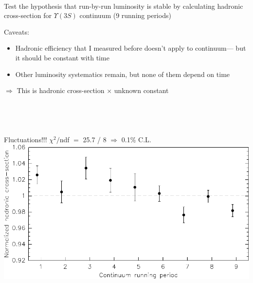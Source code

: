 \documentclass[landscape]{article}
\newenvironment{slide}{\mbox{ }\vfill}{\vfill \mbox{ } \pagebreak}
\begin{document}
\begin{slide}
  \begin{center}

    \vfill \begin{minipage}{0.85\linewidth} Test the hypothesis that
      run-by-run luminosity is stable by calculating hadronic
      cross-section for $\Upsilon(3S)$ continuum (9 running periods)
    \end{minipage}

    \vfill \begin{minipage}{0.85\linewidth}
      Caveats:
      \begin{itemize}
        \item Hadronic efficiency that I measured before doesn't apply to
          continuum--- but it should be constant with time

        \item Other luminosity systematics remain, but none of them depend
	  on time
      \end{itemize}
    \end{minipage}

    \vfill \begin{minipage}{0.85\linewidth}
      $\Longrightarrow$ This is hadronic cross-section $\times$
      unknown constant
    \end{minipage}

  \vfill
  \end{center}
\end{slide}

\begin{slide}
  \begin{center}
    \Huge Fluctuations!!!  \hspace{0.5 cm} $\chi^2/$ndf $=$ 25.7 / 8 \hspace{0.5 cm} $\Rightarrow$ 0.1\% C.L. \\

    \vfill \includegraphics[width=\linewidth]{prepforpta4_0.pdf}
  \end{center}
\end{slide}
\end{document}
